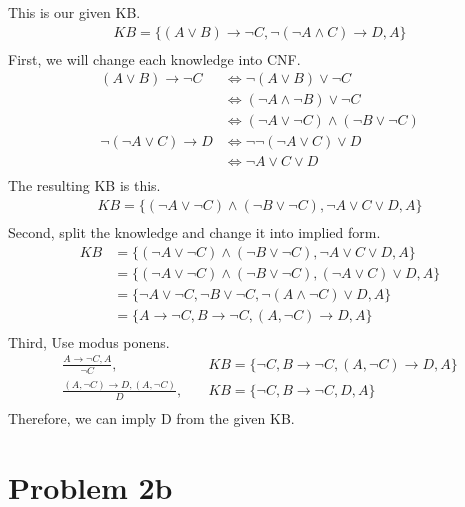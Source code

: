 \documentclass[12pt]{article}
\begin{document}
This is our given KB.
\begin{align*}
KB = \{(A \lor B ) \rightarrow \lnot C, \lnot (\lnot A \land C) \rightarrow D, A \} \\
\end{align*}
First, we will change each knowledge into CNF.
\begin{align*}
 (A \lor B) \rightarrow \lnot C & \iff \lnot (A \lor B) \lor \lnot C \\
 & \iff (\lnot A \land \lnot B) \lor \lnot C \\
 & \iff (\lnot A \lor \lnot C) \land (\lnot B \lor \lnot C) \\
\lnot (\lnot A \lor C) \rightarrow D & \iff \lnot \lnot (\lnot A \lor C) \lor D  \\
& \iff \lnot A \lor C \lor D  \\
\end{align*}
The resulting KB is this.
\begin{align*}
KB = \{(\lnot A \lor \lnot C) \land (\lnot B \lor \lnot C), \lnot A \lor C \lor D, A\} \\
\end{align*}
Second, split the knowledge and change it into implied form.
\begin{align*}
KB & = \{(\lnot A \lor \lnot C) \land (\lnot B \lor \lnot C), \lnot A \lor C \lor D, A \} \\
& = \{(\lnot A \lor \lnot C) \land (\lnot B \lor \lnot C), (\lnot A \lor C) \lor D, A \} \\
& = \{\lnot A \lor \lnot C, \lnot B \lor \lnot C, \lnot (A \land \lnot C) \lor D, A \} \\
& = \{A \rightarrow \lnot C, B \rightarrow \lnot C, (A, \lnot C) \rightarrow D, A \}  \\
\end{align*}
Third, Use modus ponens.
\begin{align*}
\frac{A \rightarrow \lnot C, A}{\lnot C} , \quad & KB = \{ \lnot C, B \rightarrow \lnot C, (A, \lnot C) \rightarrow D, A\} \\
\frac{(A, \lnot C) \rightarrow D, (A, \lnot C)}{D} , \quad & KB = \{ \lnot C, B \rightarrow \lnot C, D, A\} \\
\end{align*}
Therefore, we can imply D from the given KB.

\section*{Problem 2b}
\end{document}
